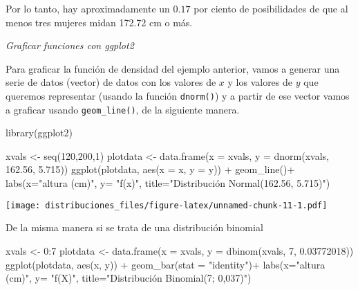 \documentclass[
]{article}
\newenvironment{Shaded}{\begin{snugshade}}{\end{snugshade}}
\newcommand{\AttributeTok}[1]{\textcolor[rgb]{0.77,0.63,0.00}{#1}}
\newcommand{\DecValTok}[1]{\textcolor[rgb]{0.00,0.00,0.81}{#1}}
\newcommand{\FloatTok}[1]{\textcolor[rgb]{0.00,0.00,0.81}{#1}}
\newcommand{\FunctionTok}[1]{\textcolor[rgb]{0.00,0.00,0.00}{#1}}
\newcommand{\NormalTok}[1]{#1}
\newcommand{\OtherTok}[1]{\textcolor[rgb]{0.56,0.35,0.01}{#1}}
\newcommand{\SpecialCharTok}[1]{\textcolor[rgb]{0.00,0.00,0.00}{#1}}
\newcommand{\StringTok}[1]{\textcolor[rgb]{0.31,0.60,0.02}{#1}}
\begin{document}
Por lo tanto, hay aproximadamente un \(0.17\) por ciento de
posibilidades de que al menos tres mujeres midan 172.72 cm o más.

\pagebreak

\emph{Graficar funciones con ggplot2}

Para graficar la función de densidad del ejemplo anterior, vamos a
generar una serie de datos (vector) de datos con los valores de \(x\) y
los valores de \(y\) que queremos representar (usando la función
\texttt{dnorm()}) y a partir de ese vector vamos a graficar usando
\texttt{geom\_line()}, de la siguiente manera.

\begin{Shaded}
\begin{Highlighting}[]
\FunctionTok{library}\NormalTok{(ggplot2)}

\NormalTok{xvals }\OtherTok{\textless{}{-}} \FunctionTok{seq}\NormalTok{(}\DecValTok{120}\NormalTok{,}\DecValTok{200}\NormalTok{,}\DecValTok{1}\NormalTok{)}
\NormalTok{plotdata }\OtherTok{\textless{}{-}} \FunctionTok{data.frame}\NormalTok{(}\AttributeTok{x =}\NormalTok{ xvals, }\AttributeTok{y =} \FunctionTok{dnorm}\NormalTok{(xvals, }\FloatTok{162.56}\NormalTok{, }\FloatTok{5.715}\NormalTok{))}
\FunctionTok{ggplot}\NormalTok{(plotdata, }\FunctionTok{aes}\NormalTok{(}\AttributeTok{x =}\NormalTok{ x, }\AttributeTok{y =}\NormalTok{ y)) }\SpecialCharTok{+}
  \FunctionTok{geom\_line}\NormalTok{()}\SpecialCharTok{+}
  \FunctionTok{labs}\NormalTok{(}\AttributeTok{x=}\StringTok{"altura (cm)"}\NormalTok{, }\AttributeTok{y=} \StringTok{"f(x)"}\NormalTok{, }\AttributeTok{title=}\StringTok{"Distribución Normal(162.56, 5.715)"}\NormalTok{)}
\end{Highlighting}
\end{Shaded}

\texttt{[image: distribuciones\_files/figure-latex/unnamed-chunk-11-1.pdf]}

\pagebreak

De la misma manera si se trata de una distribución binomial

\begin{Shaded}
\begin{Highlighting}[]
\NormalTok{xvals }\OtherTok{\textless{}{-}} \DecValTok{0}\SpecialCharTok{:}\DecValTok{7}
\NormalTok{plotdata }\OtherTok{\textless{}{-}} \FunctionTok{data.frame}\NormalTok{(}\AttributeTok{x =}\NormalTok{ xvals, }\AttributeTok{y =} \FunctionTok{dbinom}\NormalTok{(xvals, }\DecValTok{7}\NormalTok{, }\FloatTok{0.03772018}\NormalTok{))}
\FunctionTok{ggplot}\NormalTok{(plotdata, }\FunctionTok{aes}\NormalTok{(x, y)) }\SpecialCharTok{+} \FunctionTok{geom\_bar}\NormalTok{(}\AttributeTok{stat =} \StringTok{"identity"}\NormalTok{)}\SpecialCharTok{+}
  \FunctionTok{labs}\NormalTok{(}\AttributeTok{x=}\StringTok{"altura (cm)"}\NormalTok{, }\AttributeTok{y=} \StringTok{"f(X)"}\NormalTok{, }\AttributeTok{title=}\StringTok{"Distribución Binomial(7; 0,037)"}\NormalTok{)}
\end{Highlighting}
\end{Shaded}
\end{document}
